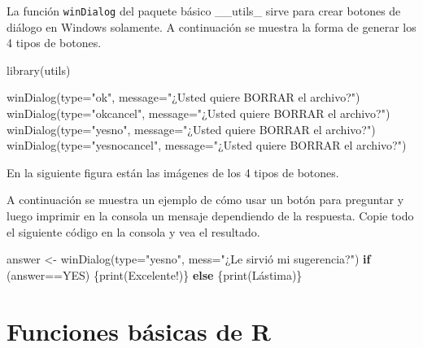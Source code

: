 \documentclass[
]{book}
\makeatletter
\newenvironment{Shaded}{\begin{snugshade}}{\end{snugshade}}
\newcommand{\AttributeTok}[1]{\textcolor[rgb]{0.77,0.63,0.00}{#1}}
\newcommand{\ControlFlowTok}[1]{\textcolor[rgb]{0.13,0.29,0.53}{\textbf{#1}}}
\newcommand{\FunctionTok}[1]{\textcolor[rgb]{0.00,0.00,0.00}{#1}}
\newcommand{\NormalTok}[1]{#1}
\newcommand{\OtherTok}[1]{\textcolor[rgb]{0.56,0.35,0.01}{#1}}
\newcommand{\SpecialCharTok}[1]{\textcolor[rgb]{0.00,0.00,0.00}{#1}}
\newcommand{\StringTok}[1]{\textcolor[rgb]{0.31,0.60,0.02}{#1}}
\newenvironment{kframe}{%
\medskip{}
\setlength{\fboxsep}{.8em}
 \def\at@end@of@kframe{}%
 \ifinner\ifhmode%
  \def\at@end@of@kframe{\end{minipage}}%
  \begin{minipage}{\columnwidth}%
 \fi\fi%
 \def\FrameCommand##1{\hskip\@totalleftmargin \hskip-\fboxsep
 \colorbox{shadecolor}{##1}\hskip-\fboxsep
     \hskip-\linewidth \hskip-\@totalleftmargin \hskip\columnwidth}%
 \MakeFramed {\advance\hsize-\width
   \@totalleftmargin\z@ \linewidth\hsize
   \@setminipage}}%
 {\par\unskip\endMakeFramed%
 \at@end@of@kframe}
\renewenvironment{Shaded}{\begin{kframe}}{\end{kframe}}
\makeatother
\begin{document}
La función \texttt{winDialog} del paquete básico \_\_utils\_ sirve para crear botones de diálogo en Windows solamente. A continuación se muestra la forma de generar los 4 tipos de botones.

\begin{Shaded}
\begin{Highlighting}[]
\FunctionTok{library}\NormalTok{(utils)}

\FunctionTok{winDialog}\NormalTok{(}\AttributeTok{type=}\StringTok{"ok"}\NormalTok{, }\AttributeTok{message=}\StringTok{"¿Usted quiere BORRAR el archivo?"}\NormalTok{)}
\FunctionTok{winDialog}\NormalTok{(}\AttributeTok{type=}\StringTok{"okcancel"}\NormalTok{, }\AttributeTok{message=}\StringTok{"¿Usted quiere BORRAR el archivo?"}\NormalTok{)}
\FunctionTok{winDialog}\NormalTok{(}\AttributeTok{type=}\StringTok{"yesno"}\NormalTok{, }\AttributeTok{message=}\StringTok{"¿Usted quiere BORRAR el archivo?"}\NormalTok{)}
\FunctionTok{winDialog}\NormalTok{(}\AttributeTok{type=}\StringTok{"yesnocancel"}\NormalTok{, }\AttributeTok{message=}\StringTok{"¿Usted quiere BORRAR el archivo?"}\NormalTok{)}
\end{Highlighting}
\end{Shaded}

En la siguiente figura están las imágenes de los 4 tipos de botones.

A continuación se muestra un ejemplo de cómo usar un botón para preguntar y luego imprimir en la consola un mensaje dependiendo de la respuesta. Copie todo el siguiente código en la consola y vea el resultado.

\begin{Shaded}
\begin{Highlighting}[]
\NormalTok{answer }\OtherTok{\textless{}{-}} \FunctionTok{winDialog}\NormalTok{(}\AttributeTok{type=}\StringTok{"yesno"}\NormalTok{, }\AttributeTok{mess=}\StringTok{"¿Le sirvió mi sugerencia?"}\NormalTok{)}
\ControlFlowTok{if}\NormalTok{ (answer}\SpecialCharTok{==}\StringTok{\textquotesingle{}YES\textquotesingle{}}\NormalTok{) \{}\FunctionTok{print}\NormalTok{(}\StringTok{\textquotesingle{}Excelente!\textquotesingle{}}\NormalTok{)\} }\ControlFlowTok{else}\NormalTok{ \{}\FunctionTok{print}\NormalTok{(}\StringTok{\textquotesingle{}Lástima\textquotesingle{}}\NormalTok{)\}}
\end{Highlighting}
\end{Shaded}

\hypertarget{funbas}{%
\chapter{Funciones básicas de R}\label{funbas}}
\end{document}
